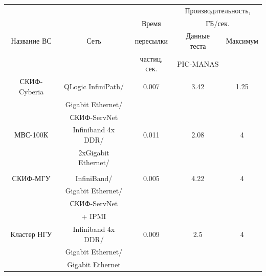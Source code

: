 	\label{tab_net_gb_sec}
	\begin{tabular}{|c|c|c|c|c|}
		\hline
		&                     &        &    \multicolumn{2}{|c|}{Производительность,} \\ 
		&                     & Время            &    \multicolumn{2}{|c|}{ГБ/сек.} \\ \cline{4-5}              
		Название ВС  & Сеть                & пересылки   & Данные теста       & Максимум  \\
		&                     & частиц, сек.&   PIC-MANAS        &           \\  \hline
		СКИФ-Cyberia &  QLogic InfiniPath/ &  0.007      &      3.42          & 1.25    \\ 
		&  Gigabit Ethernet/  &             &                    &          \\
		&  СКИФ-ServNet       &             &                    &          \\ \hline
		
		МВС-100К     &  Infiniband 4x DDR/ &  0.011           &     2.08      & 4       \\ 
		&  2xGigabit Ethernet/&             &                    &          \\
		&                     &             &                    &          \\ \hline  
		СКИФ-МГУ     & InfiniBand/         &  0.005           &     4.22      & 4       \\   
		&  Gigabit Ethernet/  &              &                    &          \\
		&  СКИФ-ServNet       &              &                    &          \\   
		&   + IPMI            &             &                     &          \\ \hline  
		Кластер НГУ  & Infiniband 4x DDR/  &  0.009        &     2.5          & 4       \\ 
		&   Gigabit Ethernet/ &           &                      &          \\
		&   Gigabit Ethernet  &           &                      &          \\ \hline
	\end{tabular}	


